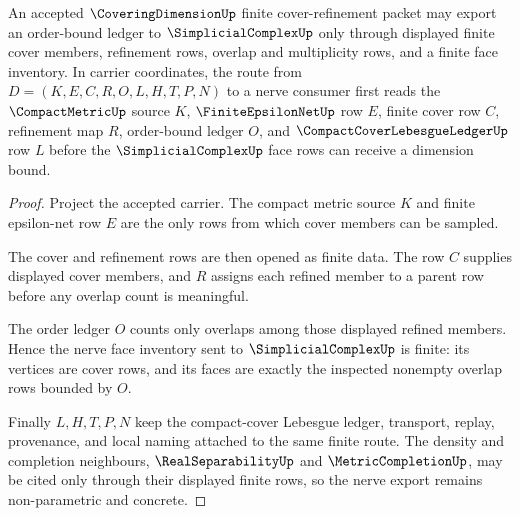 \begin{theorem}
\label{thm:coveringdimension-nerve-order-bound}
An accepted $\CoveringDimensionUp$ finite cover-refinement packet may export an order-bound ledger to $\SimplicialComplexUp$ only through displayed finite cover members, refinement rows, overlap and multiplicity rows, and a finite face inventory. In carrier coordinates, the route from $D=(K,E,C,R,O,L,H,T,P,N)$ to a nerve consumer first reads the $\CompactMetricUp$ source $K$, $\FiniteEpsilonNetUp$ row $E$, finite cover row $C$, refinement map $R$, order-bound ledger $O$, and $\CompactCoverLebesgueLedgerUp$ row $L$ before the $\SimplicialComplexUp$ face rows can receive a dimension bound.
\end{theorem}
\begin{proof}
Project the accepted carrier. The compact metric source $K$ and finite epsilon-net row $E$ are the only rows from which cover members can be sampled.

The cover and refinement rows are then opened as finite data. The row $C$ supplies displayed cover members, and $R$ assigns each refined member to a parent row before any overlap count is meaningful.

The order ledger $O$ counts only overlaps among those displayed refined members. Hence the nerve face inventory sent to $\SimplicialComplexUp$ is finite: its vertices are cover rows, and its faces are exactly the inspected nonempty overlap rows bounded by $O$.

Finally $L,H,T,P,N$ keep the compact-cover Lebesgue ledger, transport, replay, provenance, and local naming attached to the same finite route. The density and completion neighbours, $\RealSeparabilityUp$ and $\MetricCompletionUp$, may be cited only through their displayed finite rows, so the nerve export remains non-parametric and concrete.
\end{proof}

